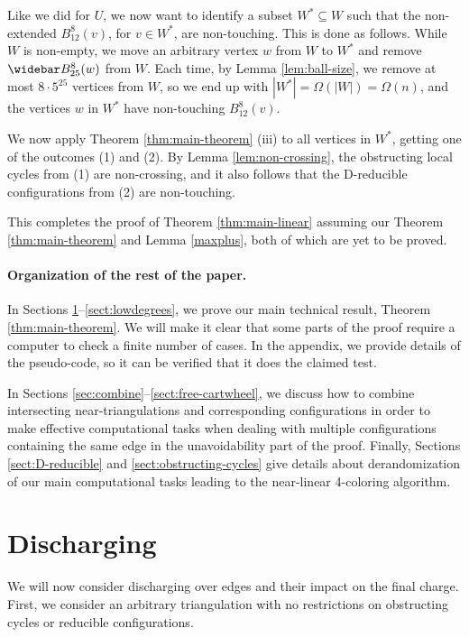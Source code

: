 \documentclass[10pt,a4paper]{article}
\renewcommand{\bar}{\widebar}
\def\showlabel#1{}
\begin{document}
Like we did for $U$, we now want to identify a subset $W^*\subseteq W$ such that the non-extended $B_{12}^8(v)$, for $v \in W^*$, are non-touching. 
This is done as follows. While $W$ is
non-empty, we move an arbitrary vertex $w$ from $W$ to $W^*$ and remove $\bar B^8_{25}(w)$
from $W$.
Each time, by Lemma \ref{lem:ball-size}, we remove at most $8\cdot 5^{25}$ vertices from $W$,
so we end up with $|W^*|=\Omega(|W|)=\Omega(n)$, and the vertices $w$ in $W^*$ have non-touching $B^8_{12}(v)$.

We now apply Theorem \ref{thm:main-theorem} (iii) to all vertices in $W^*$, getting one of the outcomes (1) and (2).
By Lemma \ref{lem:non-crossing}, the obstructing local cycles from (1) are non-crossing, and it also follows that the D-reducible configurations from (2) are non-touching. 

This completes the proof of Theorem \ref{thm:main-linear} assuming our Theorem \ref{thm:main-theorem} and Lemma \ref{maxplus}, both of which are yet to be proved.


\paragraph{Organization of the rest of the paper.}
In Sections \ref{sect:edge-charge}--\ref{sect:lowdegrees}, we prove our main technical result, 
Theorem \ref{thm:main-theorem}.
We will make it clear that some parts of the proof require a computer to check a finite number of cases. In the appendix, we provide details of the pseudo-code, so it can be verified that it does the claimed test. 

In Sections \ref{sec:combine}--\ref{sect:free-cartwheel}, we discuss how to combine intersecting near-triangulations and corresponding configurations in order to make effective computational tasks when dealing with multiple configurations containing the same edge in the unavoidability part of the proof. Finally, Sections \ref{sect:D-reducible} and \ref{sect:obstructing-cycles} give details about derandomization of our main computational tasks leading to the near-linear 4-coloring algorithm. 



\section{Discharging}\label{sect:edge-charge}\showlabel{sect:edge-charge}

We will now consider discharging over edges and their impact on the final charge. First, we consider an arbitrary triangulation with no restrictions on obstructing cycles or reducible configurations.
\end{document}
